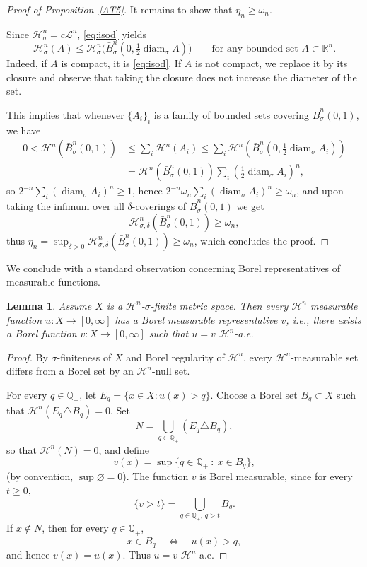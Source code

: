 \documentclass[12pt,leqno]{amsart}
\newtheorem{lemma}[theorem]{Lemma}
\theoremstyle{definition}
\newcommand{\bbbr}{\mathbb R}
\newcommand{\qp}{{\mathbb Q}_+}
\def\diam{\operatorname{diam}}
\def\H{{\mathcal H}}
\def\LL{{\mathcal L}}
\numberwithin{theorem}{section} \numberwithin{equation}{section}
\begin{document}
\begin{proof}[Proof of Proposition~\ref{AT5}]
It remains to show that $\eta_n\geq\omega_n$.

Since $\H^n_\sigma=c\LL^n$, \eqref{eq:isod} yields
$$
\H^n_\sigma(A)\leq\H^n_\sigma\big(\bar{B}_\sigma^n(0,\tfrac{1}{2}\diam_\sigma A)\big)
\qquad
\text{for any bounded set } A\subset\bbbr^n.
$$
Indeed, if $A$ is compact, it is \eqref{eq:isod}. If $A$ is not compact, we replace it by its closure and observe that taking the closure does not increase the diameter of the set.

This implies that whenever $\{A_i\}_i$ is a family of bounded sets covering $\bar{B}^n_\sigma(0,1)$, we have
\begin{equation*}
\begin{split}
0<
\H^n(\bar{B}^n_\sigma(0,1))&\leq \sum_i \H^n(A_i)\leq
\sum_i\H^n(\bar{B}^n_\sigma(0,\tfrac{1}{2}\diam_\sigma A_i))
\\
&=\H^n(\bar{B}^n_\sigma(0,1)) \sum_i(\tfrac{1}{2}\diam_\sigma A_i)^n,
\end{split}
\end{equation*}
so $2^{-n}\sum_i(\diam_\sigma A_i)^n\geq 1$, hence $2^{-n}\omega_n\sum_i(\diam_\sigma A_i)^n\geq \omega_n$,
and upon taking the infimum over all $\delta$-coverings of $\bar{B}^n_\sigma(0,1)$ we get
$$
\H^n_{\sigma,\delta}(\bar{B}^n_\sigma(0,1)) \geq\omega_n,
$$
thus
$\eta_n=\sup_{\delta>0} \H^n_{\sigma,\delta}(\bar{B}^n_\sigma(0,1))\geq \omega_n$, which concludes the proof.
\end{proof}
We conclude with a standard observation concerning Borel representatives of measurable functions.
\begin{lemma}
\label{app:measborel}
Assume $X$ is a $\H^n$-$\sigma$-finite metric space. Then every $\H^n$ measurable function $u:X\to[0,\infty]$ has a Borel measurable representative $v$, i.e., there exists a Borel function $v:X\to [0,\infty]$ such that $u=v$ $\H^n$-a.e.
\end{lemma}
\begin{proof}
By $\sigma$-finiteness of $X$ and Borel regularity of $\H^n$, every
$\H^n$-measurable set differs from a Borel set by an $\H^n$-null set.

For every $q\in\qp$, let $E_q=\{x\in X:u(x)>q\}$.
Choose a Borel set $B_q\subset X$ such that $\H^n(E_q\triangle B_q)=0$.
Set
$$
N=\bigcup_{q\in\qp}(E_q\triangle B_q),
$$
so that $\H^n(N)=0$, and define
$$
v(x)=\sup\{q\in\qp~:~x\in B_q\},
$$
(by convention,  $\sup\varnothing=0$). The function $v$ is Borel measurable, since for every $t\geq 0$,
$$
\{v>t\}=\bigcup_{q\in\qp,\,q>t}B_q.
$$
If $x\not\in N$, then for every $q\in\qp$,
$$
x\in B_q\quad\Longleftrightarrow\quad u(x)>q,
$$
and hence $v(x)=u(x)$. Thus $u=v$ $\H^n$-a.e.
\end{proof}
\end{document}
